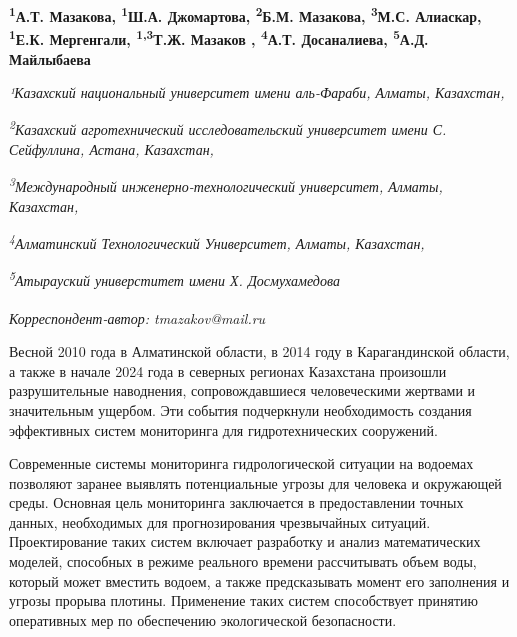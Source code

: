 
\begin{articleheader}

{\bfseries
\textsuperscript{1}А.Т. Мазакова\authorid,
\textsuperscript{1}Ш.А. Джомартова\authorid,
\textsuperscript{2}Б.М. Мазакова\authorid,
\textsuperscript{3}М.С. Алиаскар\authorid,
\textsuperscript{1}Е.К. Мергенгали\authorid,
\textsuperscript{1,3}Т.Ж. Мазаков\textsuperscript{\envelope } \authorid,
\textsuperscript{4}А.Т. Досаналиева\authorid,
\textsuperscript{5}А.Д. Майлыбаева\authorid}
\end{articleheader}

\begin{affiliation}
\emph{¹Казахский национальный университет имени аль-Фараби, Алматы, Казахстан,}

\emph{\textsuperscript{2}Казахский агротехнический исследовательский университет имени С. Сейфуллина, Астана, Казахстан,}

\emph{\textsuperscript{3}Международный инженерно-технологический университет, Алматы, Казахстан,}

\emph{\textsuperscript{4}Алматинский Технологический Университет, Алматы, Казахстан,}

\emph{\textsuperscript{5}Атырауский универститет имени Х. Досмухамедова}

\raggedright \textsuperscript{\envelope }\emph{Корреспондент-автор: tmazakov@mail.ru}
\end{affiliation}

Весной 2010 года в Алматинской области, в 2014 году в Карагандинской
области, а также в начале 2024 года в северных регионах Казахстана
произошли разрушительные наводнения, сопровождавшиеся человеческими
жертвами и значительным ущербом. Эти события подчеркнули необходимость
создания эффективных систем мониторинга для гидротехнических сооружений.

Современные системы мониторинга гидрологической ситуации на водоемах
позволяют заранее выявлять потенциальные угрозы для человека и
окружающей среды. Основная цель мониторинга заключается в предоставлении
точных данных, необходимых для прогнозирования чрезвычайных ситуаций.
Проектирование таких систем включает разработку и анализ математических
моделей, способных в режиме реального времени рассчитывать объем воды,
который может вместить водоем, а также предсказывать момент его
заполнения и угрозы прорыва плотины. Применение таких систем
способствует принятию оперативных мер по обеспечению экологической
безопасности.

